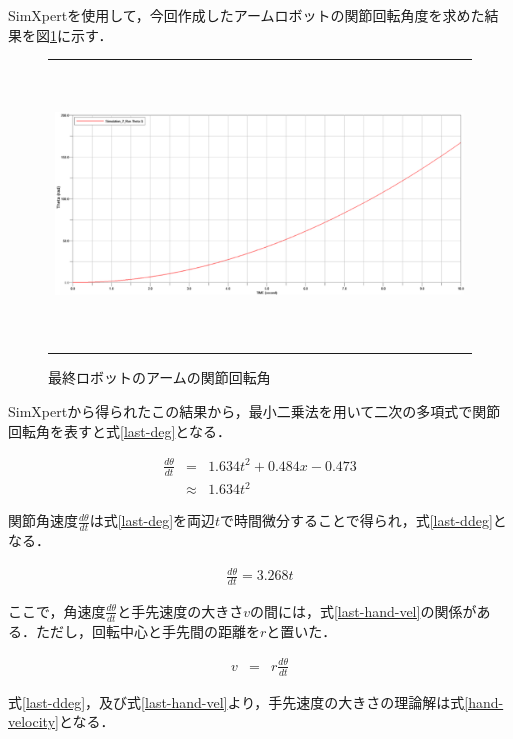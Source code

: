 SimXpertを使用して，今回作成したアームロボットの関節回転角度を求めた結果を図\ref{last-kaiten}に示す．

\begin{figure}[htbp]
  \begin{center}
    \begin{tabular}{c}
      \includegraphics[height=7.5cm]{img/eps/last-kaiten.eps}
    \end{tabular}
    \caption{最終ロボットのアームの関節回転角}
    \label{last-kaiten}
  \end{center}
\end{figure}

SimXpertから得られたこの結果から，最小二乗法を用いて二次の多項式で関節回転角を表すと式\ref{last-deg}となる．

\begin{eqnarray}
  \frac{d\theta}{dt} &=& 1.634t^2+0.484x-0.473 \nonumber \\
  &\approx& 1.634t^2
  \label{last-deg}
\end{eqnarray}

関節角速度\(\frac{d\theta}{dt}\)は式\ref{last-deg}を両辺\(t\)で時間微分することで得られ，式\ref{last-ddeg}となる．

\begin{eqnarray}
  \frac{d\theta}{dt} = 3.268t
  \label{last-ddeg}
\end{eqnarray}

ここで，角速度\(\frac{d\theta}{dt}\)と手先速度の大きさ\(v\)の間には，式\ref{last-hand-vel}の関係がある．ただし，回転中心と手先間の距離を\(r\)と置いた．

\begin{eqnarray}
  v &=& r\frac{d\theta}{dt}
  \label{last-hand-vel}
\end{eqnarray}

式\ref{last-ddeg}，及び式\ref{last-hand-vel}より，手先速度の大きさの理論解は式\ref{hand-velocity}となる．

